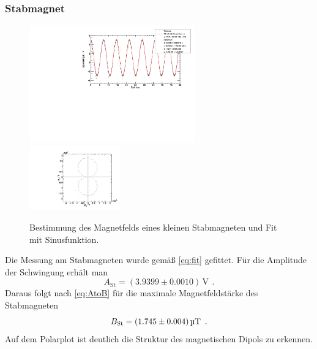 \subsubsection{Stabmagnet}
\begin{figure}[H]
\begin{center}
  \includegraphics[width=0.64\textwidth]{../img/fit_Magnet.pdf}
  \includegraphics[width=0.35\textwidth]{../img/polar_Magnet.pdf}
  \caption{Bestimmung des Magnetfelds eines kleinen Stabmagneten und Fit mit Sinusfunktion.}
  \label{img:magnet}
\end{center}
\end{figure}
Die Messung am Stabmagneten wurde gemäß \autoref{eq:fit} gefittet.
Für die Amplitude der Schwingung erhält man
\begin{equation}
\label{}
A_{\text{St}}=(3.9399 \pm 0.0010)\, \text{V} \ \, .
\end{equation}
Daraus folgt nach \autoref{eq:AtoB} für die maximale Magnetfeldstärke des Stabmagneten
\begin{equation}
\label{}
B_{\text{St}} = (1.745 \pm 0.004)\,\text{\textmu T} \ \, .
\end{equation}
Auf dem Polarplot ist deutlich die Struktur des magnetischen Dipols zu erkennen.


